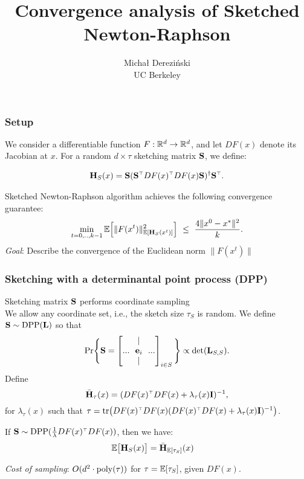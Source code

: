 \documentclass[10pt]{beamer}
\title[]{Convergence analysis of Sketched Newton-Raphson}
\author[]{Micha{\l} Derezi\'{n}ski\\
UC Berkeley}
\begin{document}
\begin{frame}
  \titlepage
\end{frame}

\linespread{1.3}


\begin{frame}
  \frametitle{Setup}
  We consider a differentiable function $F:\R^d\rightarrow\R^d$, and
  let $DF(x)$ denote its Jacobian at $x$. For a random $d\times \tau$
  sketching matrix $\S$, we define:

  \begin{align*}
    \H_S(x) = \S(\S^\top DF(x)^\top DF(x)\S)^\dagger\S^\top.
  \end{align*}

  Sketched Newton-Raphson algorithm achieves the following convergence guarantee:
  \begin{align*}
    \min_{t=0,..,k-1}\E\Big[\|F(x^t)\|^2_{\E[\H_S(x^t)]}\Big]\ \leq\ \frac {4\|x^0-x^*\|^2}{k}.
  \end{align*}
\emph{Goal}: Describe the convergence of the Euclidean norm $\|F(x^t)\|$
\end{frame}

\begin{frame}
  \frametitle{Sketching with a determinantal point process (DPP)}
  Sketching matrix $\S$ performs coordinate sampling\\
  We allow any coordinate set, i.e., the sketch size $\tau_S$ is random.
  We define $\S\sim \DPP(\L)$ so that
  \begin{align*}
    \Pr\Bigg\{\S = \begin{bmatrix}&|\\ ...\!\!&
      \e_i&\!\!...\\&|&\end{bmatrix}_{i\in S}\Bigg\} \propto
                        \det(\L_{S,S}).
  \end{align*}
  Define \[\bar\H_\tau(x) = (DF(x)^\top DF(x) +\lambda_\tau(x)\I)^{-1},\]
  for $\lambda_\tau(x)$ such that
  $\tau = \tr\big(DF(x)^\top DF(x)  (DF(x)^\top DF(x) +\lambda_\tau(x)\I)^{-1}\big)$.

  \begin{theorem}
    If $\S\sim\DPP(\frac1\lambda DF(x)^\top DF(x))$, then we have:
    \begin{align*}
      \E\big[\H_S(x)\big] &=\bar\H_{\E[\tau_S]}(x)
    \end{align*}
  \end{theorem}
  \emph{Cost of sampling}: $O(d^2\cdot\poly(\tau))$ for
  $\tau=\E[\tau_S]$, given $DF(x)$.
\end{frame}
\end{document}
